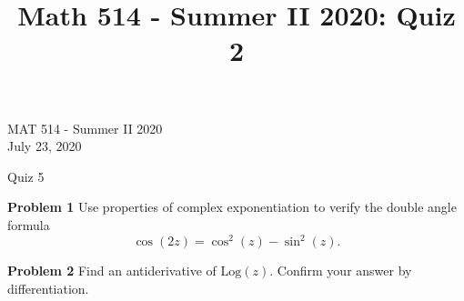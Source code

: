 \documentclass[12pt,oneside]{exam}
\title{Math 514 - Summer II 2020: Quiz 2}
\newenvironment{exercise}[1]{\vspace{.1in}\noindent\textbf{Problem #1 \hspace{.05em}}}{}
\begin{document}
\begin{flushright}
\sc MAT 514 - Summer II 2020\\
July 23, 2020
\end{flushright}
\bigskip
 
\begin{center}
\textsf{Quiz 5} 
\end{center}


\begin{exercise}{1}
Use properties of complex exponentiation to verify the double angle formula
\begin{equation*}
\cos(2z) = \cos^2(z)-\sin^2(z).
\end{equation*}
\end{exercise}

\vfill
\begin{exercise}{2}
Find an antiderivative of $\mathrm{Log}(z)$. Confirm your answer by differentiation.
\end{exercise}

\vfill
\end{document}

